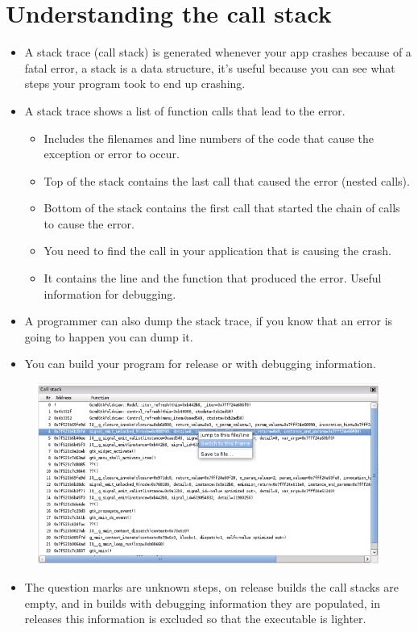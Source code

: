 \section{Understanding the call stack}
\begin{itemize}
    \item A stack trace (call stack) is generated whenever your app crashes because of a fatal error, a stack is a data structure, it's useful because you can see what steps your program took to end up crashing.
    \item A stack trace shows a list of function calls that lead to the error.
        \begin{itemize}
            \item Includes the filenames and line numbers of the code that cause the exception or error to occur. 
            \item Top of the stack contains the last call that caused the error (nested calls).
            \item Bottom of the stack contains the first call that started the chain of calls to cause the error. 
            \item You need to find the call in your application that is causing the crash.
            \item It contains the line and the function that produced the error. Useful information for debugging. 
        \end{itemize}
    
    \item A programmer can also dump the stack trace, if you know that an error is going to happen you can dump it.
    \item You can build your program for release or with debugging information.
\end{itemize}
\begin{figure}[H]
    \centering
    \includegraphics[width=15cm]{Figs/call_stack.png}  
\end{figure}
\begin{itemize}
    \item The question marks are unknown steps, on release builds the call stacks are empty, and in builds with debugging information they are populated, in releases this information is excluded so that the executable is lighter. 
\end{itemize}


